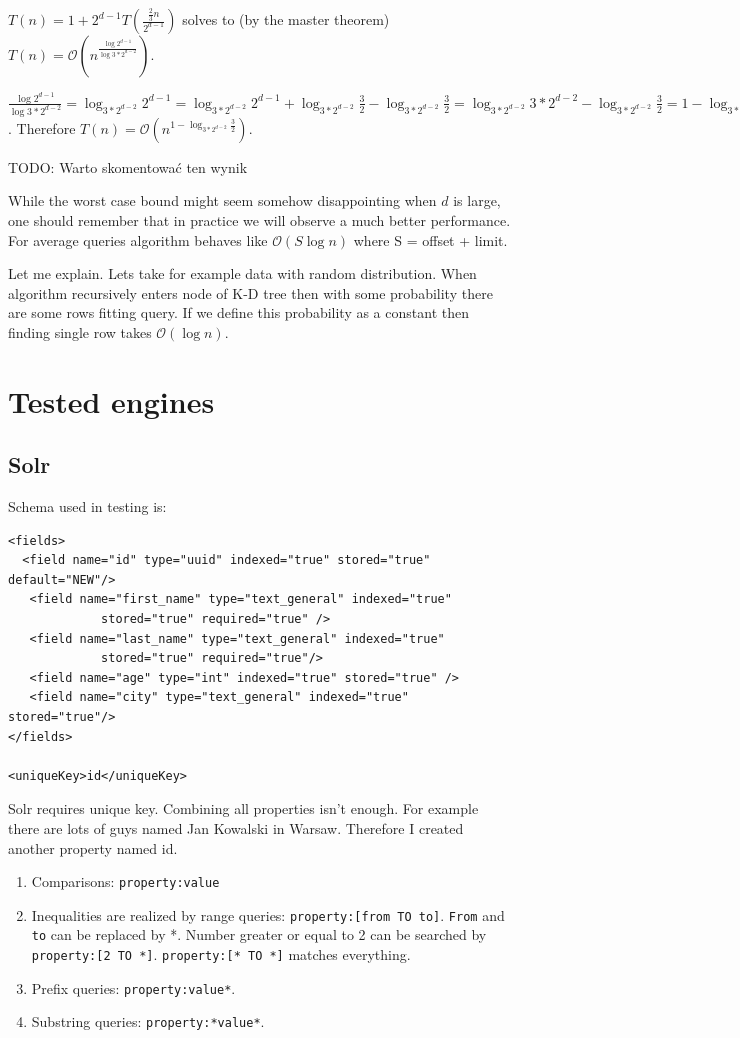 \documentclass[10pt,a4paper]{article}
\newcommand{\todo}[1]{\noindent\colorbox{myRed}{TODO: #1}}
\newcommand{\Oh}{\mathcal{O}}
\begin{document}
$T(n)=1+2^{d-1}T(\frac{\frac{2}{3}n}{2^{d-1}})$ solves to (by the master theorem) $T(n)=\Oh(n^{\frac{\log 2^{d-1}}{\log 3*2^{d-2}}})$.

$\frac{\log 2^{d-1}}{\log 3*2^{d-2}} = \log_{3*2^{d-2}}{2^{d-1}} = \log_{3*2^{d-2}}{2^{d-1}} + \log_{3*2^{d-2}}{\frac{3}{2}} - \log_{3*2^{d-2}}{\frac{3}{2}} = \log_{3*2^{d-2}}{3*2^{d-2}} - \log_{3*2^{d-2}}{\frac{3}{2}} = 1 - \log_{3*2^{d-2}}{\frac{3}{2}}$. Therefore $T(n) = \Oh(n^{1 - \log_{3*2^{d-2}}{\frac{3}{2}}})$.

\todo{Warto skomentować ten wynik}

While the worst case bound might seem somehow disappointing when $d$ is large, one should remember that in practice we will observe a much better performance. For average queries algorithm behaves like $\Oh(S \log n)$ where S = offset + limit.

Let me explain. Lets take for example data with random distribution. When algorithm recursively enters node of K-D tree then with some probability there are some rows fitting query. If we define this probability as a constant then finding single row takes $\Oh(\log n)$.

\section{Tested engines}
\subsection{Solr}

Schema used in testing is:

\begin{verbatim}
<fields>
  <field name="id" type="uuid" indexed="true" stored="true" default="NEW"/>
   <field name="first_name" type="text_general" indexed="true"
             stored="true" required="true" /> 
   <field name="last_name" type="text_general" indexed="true" 
             stored="true" required="true"/>
   <field name="age" type="int" indexed="true" stored="true" /> 
   <field name="city" type="text_general" indexed="true" stored="true"/>
</fields>

<uniqueKey>id</uniqueKey> 
\end{verbatim}

Solr requires unique key. Combining all properties isn't enough. For example there are lots of guys named Jan Kowalski in Warsaw. Therefore I created another property named id.

\begin{enumerate}
\item Comparisons: \verb|property:value|
\item Inequalities are realized by range queries: \verb|property:[from TO to]|. \verb|From| and \verb|to| can be replaced by *. Number greater or equal to 2 can be searched by \verb|property:[2 TO *]|. \verb|property:[* TO *]| matches everything.
\item Prefix queries: \verb|property:value*|.
\item Substring queries: \verb|property:*value*|.
 
\end{enumerate}
\end{document}
